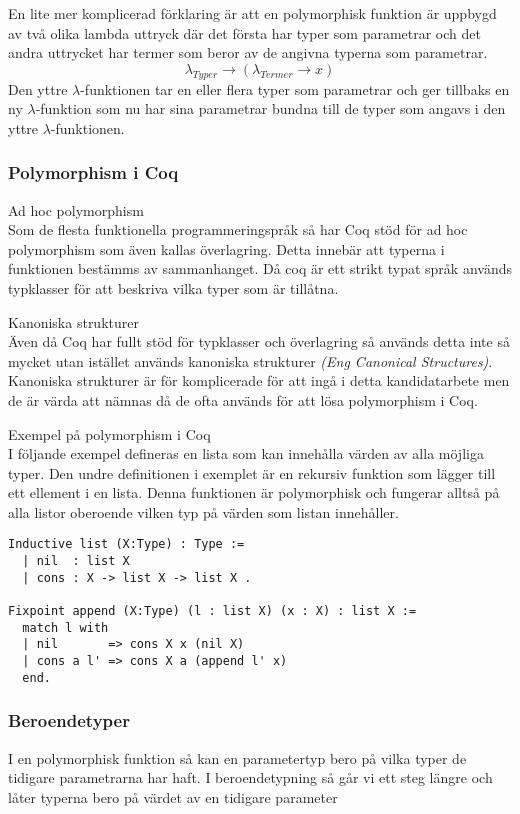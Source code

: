 En lite mer komplicerad förklaring är att en polymorphisk funktion är uppbygd av
två olika lambda uttryck där det första har typer som parametrar och det andra
uttrycket har termer som beror av de angivna typerna som parametrar.
\begin{equation}
  \lambda_{Typer} \rightarrow (\lambda_{Termer} \rightarrow x)
  \label{polymorphsk funktion}
\end{equation}
Den yttre $\lambda$-funktionen tar en eller flera typer som parametrar och ger
tillbaks en ny $\lambda$-funktion som nu har sina parametrar bundna till de
typer som angavs i den yttre $\lambda$-funktionen.

\subsubsection{Polymorphism i Coq}
{\underline \large Ad hoc polymorphism} \\
Som de flesta funktionella programmeringspråk så har Coq stöd för ad hoc
polymorphism som även kallas överlagring. Detta innebär att typerna i
funktionen bestämms av sammanhanget. Då coq är ett strikt typat språk används
typklasser för att beskriva vilka typer som är tillåtna.

{\underline \large Kanoniska strukturer} \\
Även då Coq har fullt stöd för typklasser och överlagring så används detta inte
så mycket utan istället används kanoniska strukturer {\it (Eng Canonical
Structures)}. Kanoniska strukturer är för komplicerade för att ingå i detta
kandidatarbete men de är värda att nämnas då de ofta används för att lösa
polymorphism i Coq.

{\underline \large Exempel på polymorphism i Coq} \\
I följande exempel defineras en lista som kan innehålla värden av alla möjliga
typer. Den undre definitionen i exemplet är en rekursiv funktion som lägger till
ett ellement i en lista. Denna funktionen är polymorphisk och fungerar alltså på
alla listor oberoende vilken typ på värden som listan innehåller.
\begin{verbatim}
Inductive list (X:Type) : Type :=
  | nil  : list X
  | cons : X -> list X -> list X .

Fixpoint append (X:Type) (l : list X) (x : X) : list X :=
  match l with
  | nil       => cons X x (nil X)
  | cons a l' => cons X a (append l' x)
  end.
\end{verbatim}

\subsubsection{Beroendetyper}
I en polymorphisk funktion så kan en parametertyp bero på vilka typer de
tidigare parametrarna har haft. I beroendetypning så går vi ett steg längre och
låter typerna bero på värdet av en tidigare parameter

